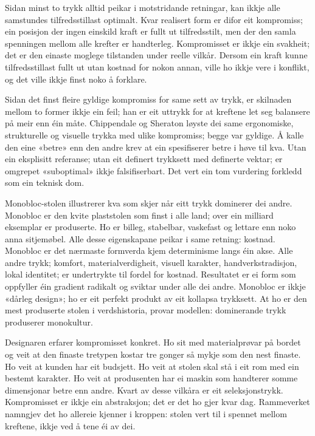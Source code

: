 Sidan minst to trykk alltid peikar i motstridande retningar, kan ikkje alle samstundes tilfredsstillast optimalt. Kvar realisert form er difor eit kompromiss; ein posisjon der ingen einskild kraft er fullt ut tilfredsstilt, men der den samla spenningen mellom alle krefter er handterleg. Kompromisset er ikkje ein svakheit; det er den einaste moglege tilstanden under reelle vilkår. Dersom ein kraft kunne tilfredsstillast fullt ut utan kostnad for nokon annan, ville ho ikkje vere i konflikt, og det ville ikkje finst noko å forklare.

Sidan det finst fleire gyldige kompromiss for same sett av trykk, er skilnaden mellom to former ikkje ein feil; han er eit uttrykk for at kreftene let seg balansere på meir enn éin måte. Chippendale og Sheraton løyste dei same ergonomiske, strukturelle og visuelle trykka med ulike kompromiss; begge var gyldige. Å kalle den eine «betre» enn den andre krev at ein spesifiserer betre i høve til kva. Utan ein eksplisitt referanse; utan eit definert trykksett med definerte vektar; er omgrepet «suboptimal» ikkje falsifiserbart. Det vert ein tom vurdering forkledd som ein teknisk dom.

Monobloc-stolen illustrerer kva som skjer når eitt trykk dominerer dei andre. Monobloc er den kvite plaststolen som finst i alle land; over ein milliard eksemplar er produserte. Ho er billeg, stabelbar, vaskefast og lettare enn noko anna sitjemøbel. Alle desse eigenskapane peikar i same retning: kostnad. Monobloc er det nærmaste formverda kjem determinisme langs éin akse. Alle andre trykk; komfort, materialverdigheit, visuell karakter, handverkstradisjon, lokal identitet; er undertrykte til fordel for kostnad. Resultatet er ei form som oppfyller éin gradient radikalt og sviktar under alle dei andre. Monobloc er ikkje «dårleg design»; ho er eit perfekt produkt av eit kollapsa trykksett. At ho er den mest produserte stolen i verdshistoria, provar modellen: dominerande trykk produserer monokultur.

Designaren erfarer kompromisset konkret. Ho sit med materialprøvar på bordet og veit at den finaste tretypen kostar tre gonger så mykje som den nest finaste. Ho veit at kunden har eit budsjett. Ho veit at stolen skal stå i eit rom med ein bestemt karakter. Ho veit at produsenten har ei maskin som handterer somme dimensjonar betre enn andre. Kvart av desse vilkåra er eit seleksjonstrykk. Kompromisset er ikkje ein abstraksjon; det er det ho gjer kvar dag. Rammeverket namngjev det ho allereie kjenner i kroppen: stolen vert til i spennet mellom kreftene, ikkje ved å tene éi av dei.


